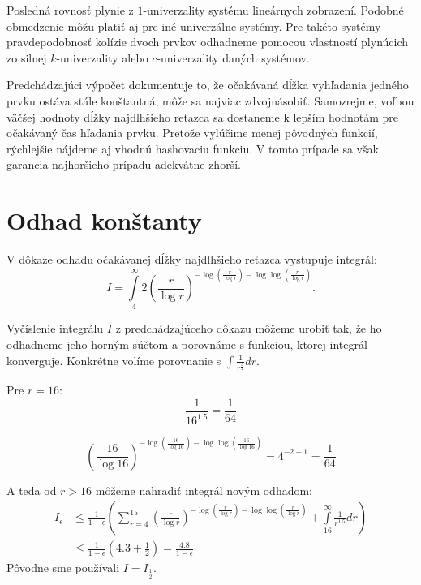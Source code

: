 Posledná rovnosť plynie z $1$-univerzality systému lineárnych zobrazení. Podobné obmedzenie môžu platiť aj pre iné univerzálne systémy. Pre takéto systémy pravdepodobnosť kolízie dvoch prvkov odhadneme pomocou vlastností plynúcich zo silnej $k$-univerzality alebo $c$-univerzality daných systémov.

Predchádzajúci výpočet dokumentuje to, že očakávaná dĺžka vyhľadania jedného prvku ostáva stále konštantná, môže sa najviac zdvojnásobiť. Samozrejme, voľbou väčšej hodnoty dĺžky najdlhšieho reťazca sa dostaneme k lepším hodnotám pre očakávaný čas hľadania prvku. Pretože vylúčime menej pôvodných funkcií, rýchlejšie nájdeme aj vhodnú hashovaciu funkciu. V tomto prípade sa však garancia najhoršieho prípadu adekvátne zhorší. 

\section{Odhad konštanty}
V dôkaze odhadu očakávanej dĺžky najdlhšieho reťazca vystupuje integrál:
\begin{displaymath}
I = \displaystyle\int\limits_4^\infty 2 \left(\frac{r}{\log r}\right)^{-\log \left(\frac{r}{\log r}\right) - \log \log \left(\frac{r}{\log r}\right)}\textit{.}
\end{displaymath}

Vyčíslenie integrálu $I$ z predchádzajúceho dôkazu môžeme urobiť tak, že ho odhadneme jeho horným súčtom a porovnáme s funkciou, ktorej integrál konverguje. Konkrétne volíme porovnanie s $\displaystyle \int \frac{1}{r^{\frac{3}{2}}} dr$. 

Pre $r = 16$:
\begin{displaymath}
\frac{1}{16 ^ {1.5}} = \frac{1}{64}
\end{displaymath}

\begin{displaymath}
\left(\frac{16}{\log 16}\right)^{-\log \left(\frac{16}{\log 16}\right) - \log \log \left(\frac{16}{\log 16}\right)} = 4^{-2 - 1} = \frac{1}{64}
\end{displaymath}

A teda od $r > 16$ môžeme nahradiť integrál novým odhadom:
\begin{displaymath}
\begin{split}
I_{\epsilon} 
	& \leq \frac{1}{1 - \epsilon} \left( \displaystyle \sum_{r = 4}^{15} \left(\frac{r}{\log r}\right)^{-\log \left(\frac{r}{\log r}\right) - \log \log \left(\frac{r}{\log r}\right)} + \int\limits_{16}^\infty \frac{1}{r^{1.5}} dr \right) \\
	& \leq \frac{1}{1 - \epsilon} \left(4.3 + \frac{1}{2}\right) = \frac{4.8}{1-\epsilon}
\end{split}
\end{displaymath}
Pôvodne sme používali $I = I_{\frac{1}{2}}$.

